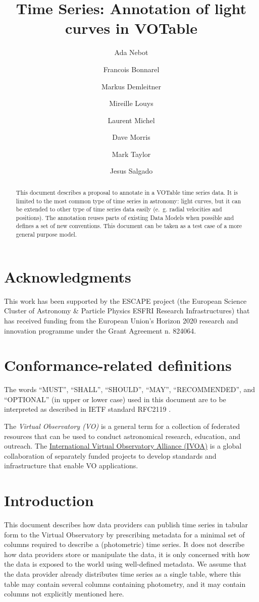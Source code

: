 \documentclass[11pt,a4paper]{ivoa} 
\title{Time Series: Annotation of light curves in VOTable}
\author[http://www.ivoa.net/twiki/bin/view/IVOA/AdaNebot]{Ada Nebot}
\author[http://www.ivoa.net/twiki/bin/view/IVOA/FrancoisBonnarel]{Francois
  Bonnarel}
\author[http://www.ivoa.net/twiki/bin/view/IVOA/MarkusDemleitner]{Markus
  Demleitner}
\author[http://www.ivoa.net/twiki/bin/view/IVOA/MireilleLouys]{Mireille
  Louys}
\author[http://www.ivoa.net/twiki/bin/view/IVOA/LaurentMichel]{Laurent
  Michel}
\author[http://www.ivoa.net/twiki/bin/view/IVOA/DaveMorris]{Dave
  Morris}
\author[http://www.ivoa.net/twiki/bin/view/IVOA/MarkTaylor]{Mark Taylor}
\author[http://www.ivoa.net/twiki/bin/view/IVOA/JesusSalgado]{Jesus
  Salgado}
\begin{document}
\begin{abstract}
  This document describes a proposal to annotate in a VOTable time
  series data. It is limited to the most common type of time series in
  astronomy: light curves, but it can be extended to other type of
  time series data easily (e.~g. radial velocities and positions). The
  annotation reuses parts of existing Data Models when possible and
  defines a set of new conventions. This document can be taken as a test
  case of a more general purpose model.
\end{abstract}

\section*{Acknowledgments}
This work has been supported by the ESCAPE project (the European
Science Cluster of Astronomy \& Particle Physics ESFRI Research
Infrastructures) that has received funding from the European Union’s
Horizon 2020 research and innovation programme under the Grant
Agreement n. 824064.

\section*{Conformance-related definitions}

The words ``MUST'', ``SHALL'', ``SHOULD'', ``MAY'', ``RECOMMENDED'',
and ``OPTIONAL'' (in upper or lower case) used in this document are to
be interpreted as described in IETF standard RFC2119
\citet{std:RFC2119}.

The \emph{Virtual Observatory (VO)} is a general term for a collection
of federated resources that can be used to conduct astronomical
research, education, and outreach.  The
\href{http://www.ivoa.net}{International Virtual Observatory Alliance
  (IVOA)} is a global collaboration of separately funded projects to
develop standards and infrastructure that enable VO applications.


\section{Introduction}
This document describes how data providers can publish time series in
tabular form to the Virtual Observatory by prescribing metadata for a
minimal set of columns required to describe a (photometric) time
series.  It does not describe how data providers store or manipulate
the data, it is only concerned with how the data is exposed to the
world using well-defined metadata. We assume that the data provider
already distributes time series as a single table, where this table
may contain several columns containing photometry, and it may contain
columns not explicitly mentioned here.
\end{document}
